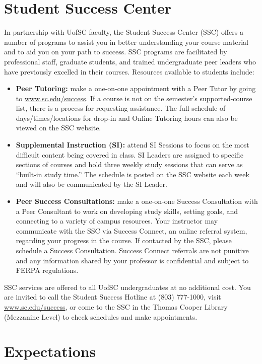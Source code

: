 \documentclass[10pt]{amsart}
\begin{document}
\section*{Student Success Center}
\noindent
In partnership with UofSC faculty, the Student Success Center (SSC) offers a number of programs to assist you in better understanding your course material and to aid you on your path to success. 
SSC programs are facilitated by professional staff, graduate students, and trained undergraduate peer leaders who have previously excelled in their courses.
Resources available to students include: 
\begin{itemize}
\item 
  \textbf{Peer Tutoring:} make a one-on-one appointment with a Peer Tutor by going to \url{www.sc.edu/success}. 
  If a course is not on the semester’s supported-course list, there is a process for requesting assistance. 
  The full schedule of days/times/locations for drop-in and Online Tutoring hours can also be viewed on the SSC website.
\item
  \textbf{Supplemental Instruction (SI):} attend SI Sessions to focus on the most difficult content being covered in class. 
  SI Leaders are assigned to specific sections of courses and hold three weekly study sessions that can serve as “built-in study time.” 
  The schedule is posted on the SSC website each week and will also be communicated by the SI Leader.
\item
  \textbf{Peer Success Consultations:} make a one-on-one Success Consultation with a Peer Consultant to work on developing study skills, setting goals, and connecting to a variety of campus resources. 
  Your instructor may communicate with the SSC via Success Connect, an online referral system, regarding your progress in the course. 
  If contacted by the SSC, please schedule a Success Consultation. 
  Success Connect referrals are not punitive and any information shared by your professor is confidential and subject to FERPA regulations.
\end{itemize}
SSC services are offered to all UofSC undergraduates at no additional cost.
You are invited to call the Student Success Hotline at (803) 777-1000, visit \url{www.sc.edu/success}, or come to the SSC in the Thomas Cooper Library (Mezzanine Level) to check schedules and make appointments. 

\newpage

\section*{Expectations}
\noindent
\end{document}
